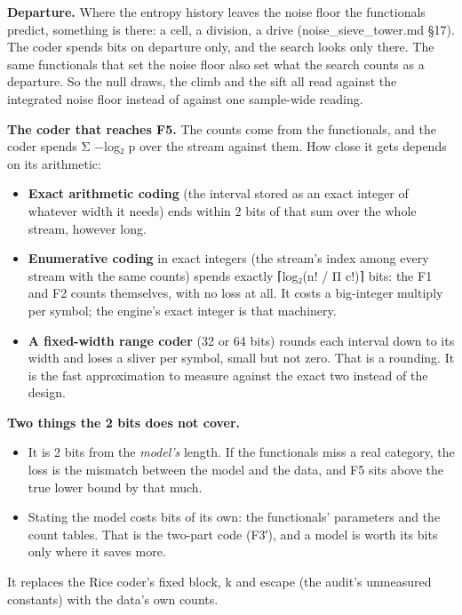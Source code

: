 \textbf{Departure.} Where the entropy history leaves the noise floor the functionals predict, something is there: a cell, a division, a drive (noise\_\allowbreak{}sieve\_\allowbreak{}tower.md §17). The coder spends bits on departure only, and the search looks only there. The same functionals that set the noise floor also set what the search counts as a departure. So the null draws, the climb and the sift all read against the integrated noise floor instead of against one sample-wide reading.

\textbf{The coder that reaches F5.} The counts come from the functionals, and the coder spends Σ −log₂ p over the stream against them. How close it gets depends on its arithmetic:

\begin{itemize}
\item \textbf{Exact arithmetic coding} (the interval stored as an exact integer of whatever width it needs) ends within 2 bits of that sum over the whole stream, however long.
\item \textbf{Enumerative coding} in exact integers (the stream's index among every stream with the same counts) spends exactly ⌈log₂(n! / Π c!)⌉ bits: the F1 and F2 counts themselves, with no loss at all. It costs a big-integer multiply per symbol; the engine's exact integer is that machinery.
\item \textbf{A fixed-width range coder} (32 or 64 bits) rounds each interval down to its width and loses a sliver per symbol, small but not zero. That is a rounding. It is the fast approximation to measure against the exact two instead of the design.
\end{itemize}

\textbf{Two things the 2 bits does not cover.}

\begin{itemize}
\item It is 2 bits from the \emph{model's} length. If the functionals miss a real category, the loss is the mismatch between the model and the data, and F5 sits above the true lower bound by that much.
\item Stating the model costs bits of its own: the functionals' parameters and the count tables. That is the two-part code (F3′), and a model is worth its bits only where it saves more.
\end{itemize}

It replaces the Rice coder's fixed block, k and escape (the audit's unmeasured constants) with the data's own counts.


